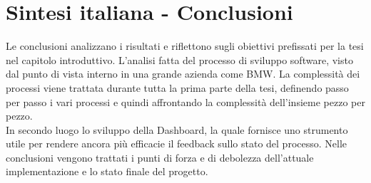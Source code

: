 \documentclass[../main.tex]{subfiles}
\begin{document}
\section{Sintesi italiana - Conclusioni}
Le conclusioni analizzano i risultati e riflettono sugli obiettivi prefissati per la tesi nel capitolo introduttivo. 
L'analisi fatta del processo di sviluppo software, visto dal punto di vista interno in una grande azienda come \gls{BMW}. La complessità dei processi viene trattata durante tutta la prima parte della tesi, definendo passo per passo i vari processi e quindi affrontando la complessità dell'insieme pezzo per pezzo.\\
In secondo luogo lo sviluppo della Dashboard, la quale fornisce uno strumento utile per rendere ancora più efficacie il feedback sullo stato del processo. Nelle conclusioni vengono trattati i punti di forza e di debolezza dell'attuale implementazione e lo stato finale del progetto.
\cleardoublepage
\end{document}
